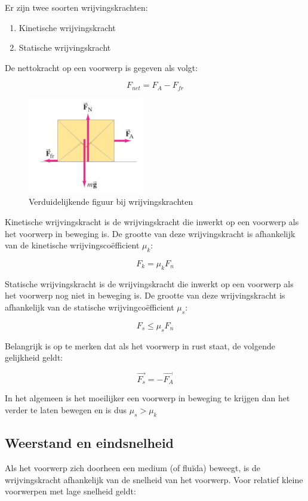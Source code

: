 \documentclass[12pt,a4paper]{article}
\begin{document}
    \newpage
    
    Er zijn twee soorten wrijvingskrachten:
    \begin{enumerate}
            [label=\alph*)]
            \item Kinetische wrijvingskracht
            \item Statische wrijvingskracht
        \end{enumerate}
        
    De nettokracht op een voorwerp is gegeven als volgt:
    
    $$ F_{net} = F_{A} -  F_{fr} $$
    
     \begin{figure}[h]
        \centering
        \includegraphics[width=0.3\linewidth]{papierdoos}
        \caption{Verduidelijkende figuur bij wrijvingskrachten}
        \label{papierdoos}
    \end{figure}    
        
    Kinetische wrijvingskracht is de wrijvingskracht die inwerkt op een voorwerp als het voorwerp in beweging is.    
    De grootte van deze wrijvingskracht is afhankelijk van de kinetische wrijvingscoëfficient $\mu_{k}$:
    
   $$ F_{k} = \mu_{k}F_{n} $$
   
   Statische wrijvingskracht is de wrijvingskracht die inwerkt op een voorwerp als het voorwerp nog niet in beweging is.
   De grootte van deze wrijvingskracht is afhankelijk van de statische wrijvingcoëfficient $\mu_{s}$:
   
   $$F_{s} \leq \mu_{s}F_{n}$$
   
   Belangrijk is op te merken dat als het voorwerp in rust staat, de volgende gelijkheid geldt:
   
   $$\vec{F_{s}} = -\vec{F_{A}}$$
   
   In het algemeen is het moeilijker een voorwerp in beweging te krijgen dan het verder te laten bewegen en is dus $\mu_{s} > \mu_{k}$
   
   \subsection{Weerstand en eindsnelheid}
   Als het voorwerp zich doorheen een medium (of fluïda) beweegt, is de wrijvingskracht afhankelijk van de snelheid van het voorwerp.
   Voor relatief kleine voorwerpen met lage snelheid geldt:
   
\end{document}

